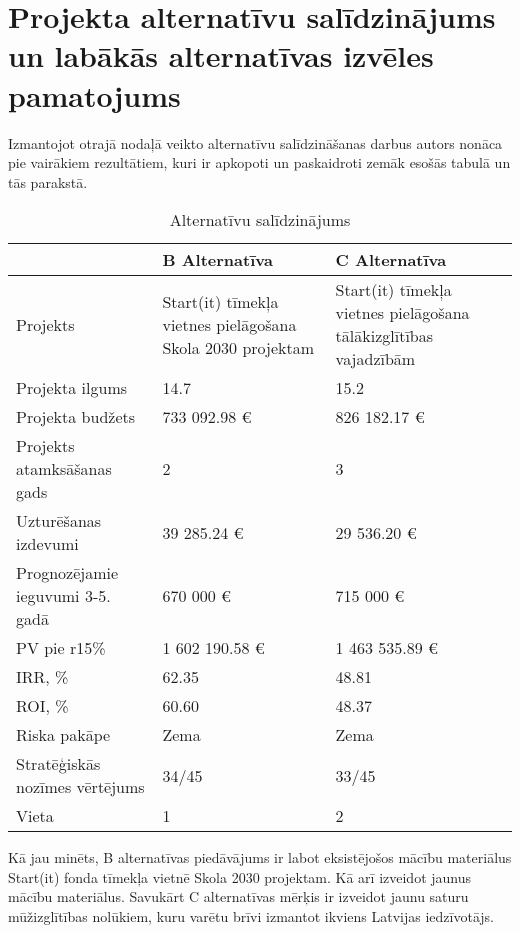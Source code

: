 \section{Projekta alternatīvu salīdzinājums un labākās alternatīvas izvēles pamatojums}
Izmantojot otrajā nodaļā veikto alternatīvu salīdzināšanas darbus autors nonāca pie vairākiem rezultātiem,
kuri ir apkopoti un paskaidroti zemāk esošās tabulā un tās parakstā.
\begin{table}[!ht]
    \centering
    \begin{tabular}{|p{}|p{}|p{}|}
        \hline
        \textbf{} & \textbf{B Alternatīva} & \textbf{C Alternatīva} \\
        \hline
        Projekts & Start(it) tīmekļa vietnes pielāgošana Skola 2030 projektam & Start(it) tīmekļa vietnes pielāgošana tālākizglītības vajadzībām \\
        \hline
        Projekta ilgums & 14.7 & 15.2 \\
        \hline
        Projekta budžets & 733 092.98 € & 826 182.17 € \\
        \hline
        Projekts atamksāšanas gads & 2 & 3 \\
        \hline
        Uzturēšanas izdevumi & 39 285.24 € & 29 536.20 € \\
        \hline
        Prognozējamie ieguvumi 3-5. gadā & 670 000 € & 715 000 €\\
        \hline
        PV pie r15\% & 1 602 190.58 € & 1 463 535.89 € \\
        \hline
        IRR, \% & 62.35 & 48.81 \\
        \hline
        ROI, \% & 60.60 & 48.37 \\
        \hline
        Riska pakāpe & Zema & Zema \\
        \hline
        Stratēģiskās nozīmes vērtējums & 34/45 & 33/45 \\
        \hline
        Vieta & 1 & 2 \\
        \hline
    \end{tabular}
    \caption{Alternatīvu salīdzinājums}
    \label{table:salidzinajums}
\end{table}
\par
Kā jau minēts, B alternatīvas piedāvājums ir labot eksistējošos mācību materiālus Start(it) fonda tīmekļa
vietnē Skola 2030 projektam. Kā arī izveidot jaunus mācību materiālus. Savukārt C alternatīvas mērķis ir
izveidot jaunu saturu mūžizglītības nolūkiem, kuru varētu brīvi izmantot ikviens Latvijas iedzīvotājs.
